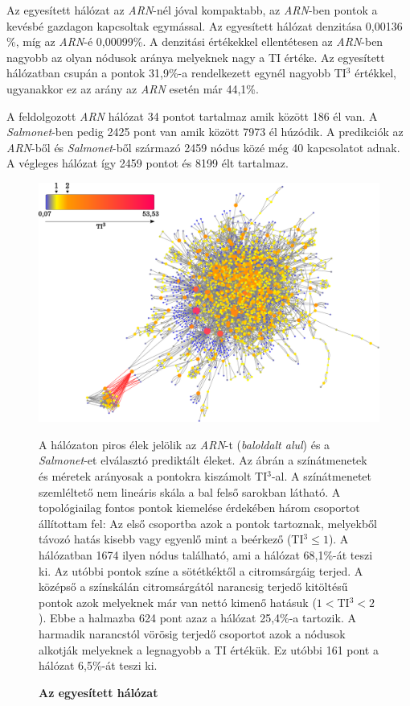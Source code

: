 \documentclass[a4paper,12pt]{article}
\newenvironment{imgdesc}{
		\small
		\singlespacing
		\begin{center}
		
	}{
		\end{center}	
	}
\begin{document}
		Az egyesített hálózat az \textit{ARN}-nél jóval kompaktabb, az \textit{ARN}-ben pontok a kevésbé gazdagon kapcsoltak egymással. Az egyesített hálózat denzitása 0,00136 \%, míg az \textit{ARN}-é 0,00099\%. A denzitási értékekkel ellentétesen az \textit{ARN}-ben nagyobb az olyan nódusok aránya melyeknek nagy a TI értéke. Az egyesített hálózatban csupán a pontok 31,9\%-a rendelkezett egynél nagyobb TI$^3$ értékkel, ugyanakkor ez az arány az \textit{ARN} esetén már 44,1\%.
		
		A feldolgozott \textit{ARN} hálózat 34 pontot tartalmaz amik között 186 él van. A \textit{Salmonet}-ben pedig 2425 pont van amik között 7973 él húzódik. A predikciók az \textit{ARN}-ből és \textit{Salmonet}-ből származó 2459 nódus közé még 40 kapcsolatot adnak. A végleges hálózat így 2459 pontot és 8199 élt tartalmaz.
			
					\begin{figure}[H]
						\includegraphics[scale=0.6]{img/merged.pdf}
						\centering
						\caption{\textbf{ Az egyesített hálózat}}
						\begin{imgdesc}
							A hálózaton piros élek jelölik az \textit{ARN}-t (\textit{baloldalt alul}) és a \textit{Salmonet}-et elválasztó prediktált éleket. Az ábrán a színátmenetek és méretek arányosak a pontokra kiszámolt TI$^3$-al. A színátmenetet szemléltető nem lineáris skála a bal felső sarokban látható. A topológiailag fontos pontok kiemelése érdekében három csoportot állítottam fel: Az első csoportba azok a pontok tartoznak, melyekből távozó hatás kisebb vagy egyenlő mint a beérkező (TI$^3\leq1$). A hálózatban 1674 ilyen nódus található, ami a hálózat 68,1\%-át teszi ki. Az utóbbi pontok színe a sötétkéktől a citromsárgáig terjed. A középső a színskálán citromsárgától narancsig terjedő kitöltésű pontok azok melyeknek már van nettó kimenő hatásuk ($1<$TI$^3<2$). Ebbe a halmazba 624 pont azaz a hálózat 25,4\%-a tartozik. A harmadik narancstól vörösig terjedő csoportot azok a nódusok alkotják melyeknek a legnagyobb a TI értékük. Ez utóbbi 161 pont a hálózat 6,5\%-át teszi ki.
						\end{imgdesc}
			
						\label{fig:merged}			 		 
					\end{figure}		
					
\end{document}
